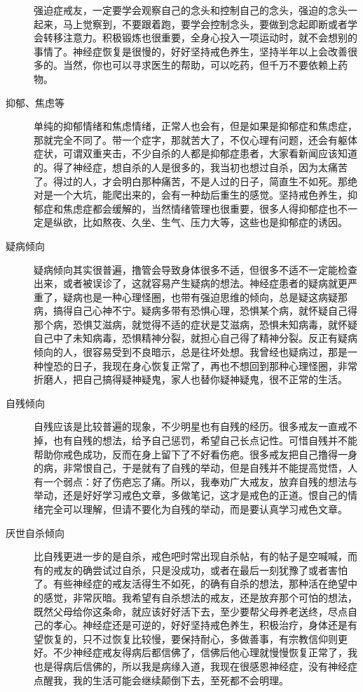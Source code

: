 \documentclass{ctexart}
\begin{document}
\begin{description}
    强迫症戒友，一定要学会观察自己的念头和控制自己的念头，强迫的念头一起来，马上觉察到，不要跟着跑，要学会控制念头，要做到念起即断或者学会转移注意力。积极锻炼也很重要，全身心投入一项运动时，就不会想别的事情了。神经症恢复是很慢的，好好坚持戒色养生，坚持半年以上会改善很多的。当然，你也可以寻求医生的帮助，可以吃药，但千万不要依赖上药物。
    \item[抑郁、焦虑等] 单纯的抑郁情绪和焦虑情绪，正常人也会有，但是如果是抑郁症和焦虑症，那就完全不同了。带一个症字，那就苦大了，不仅心理有问题，还会有躯体症状，可谓双重夹击，不少自杀的人都是抑郁症患者，大家看新闻应该知道的。得了神经症，想自杀的人是很多的，我当初也想过自杀，因为太痛苦了。得过的人，才会明白那种痛苦，不是人过的日子，简直生不如死。那绝对是一个大坑，能爬出来的，会有一种劫后重生的感觉。坚持戒色养生，抑郁症和焦虑症都会缓解的，当然情绪管理也很重要，很多人得抑郁症也不一定是纵欲，比如熬夜、久坐、生气、压力大等，这些也是抑郁症的诱因。
    \item[疑病倾向] 疑病倾向其实很普遍，撸管会导致身体很多不适，但很多不适不一定能检查出来，或者被误诊了，这就容易产生疑病的想法。神经症患者的疑病就更严重了，疑病也是一种心理怪圈，也带有强迫思维的倾向，总是疑这病疑那病，搞得自己心神不宁。疑病多带有恐惧心理，恐惧某个病，就怀疑自己得那个病，恐惧艾滋病，就觉得不适的症状是艾滋病，恐惧未知病毒，就怀疑自己中了未知病毒，恐惧精神分裂，就担心自己得了精神分裂。反正有疑病倾向的人，很容易受到不良暗示，总是往坏处想。我曾经也疑病过，那是一种惶恐的日子，我现在身心恢复正常了，再也不想回到那种心理怪圈，非常折磨人，把自己搞得疑神疑鬼，家人也替你疑神疑鬼，很不正常的生活。
    \item[自残倾向] 自残应该是比较普遍的现象，不少明星也有自残的经历。很多戒友一直戒不掉，也有自残的想法，给予自己惩罚，希望自己长点记性。可惜自残并不能帮助你戒色成功，反而在身上留下了不好看伤疤。很多戒友把自己撸得一身的病，非常恨自己，于是就有了自残的举动，但是自残并不能提高觉悟，人有一个弱点：好了伤疤忘了痛。所以，我奉劝广大戒友，放弃自残的想法与举动，还是好好学习戒色文章，多做笔记，这才是戒色的正道。恨自己的情绪完全可以理解，但请不要化为自残的举动，而是要认真学习戒色文章。
    \item[厌世自杀倾向] 比自残更进一步的是自杀，戒色吧时常出现自杀帖，有的帖子是空喊喊，而有的戒友的确尝试过自杀，只是没成功，或者在最后一刻犹豫了或者害怕了。有些神经症的戒友活得生不如死，的确有自杀的想法，那种活在绝望中的感觉，非常灰暗。我希望有自杀想法的戒友，还是放弃那个可怕的想法，既然父母给你这条命，就应该好好活下去，至少要帮父母养老送终，尽点自己的孝心。神经症还是可逆的，好好坚持戒色养生，积极治疗，身体还是有望恢复的，只不过恢复比较慢，要保持耐心，多做善事，有宗教信仰则更好。不少神经症戒友得病后都信佛了，信佛后他心理就慢慢恢复正常了，我也是得病后信佛的，所以我是病缘入道，我现在很感恩神经症，没有神经症点醒我，我的生活可能会继续颠倒下去，至死都不会明理。

\end{description}
\end{document}
